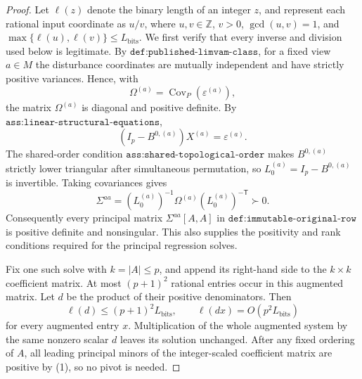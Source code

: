 \documentclass{article}
\begin{document}
\begin{proof}
Let \(\ell(z)\) denote the binary length of an integer \(z\), and represent each rational input coordinate as \(u/v\), where \(u,v\in\mathbb Z\), \(v>0\), \(\gcd(u,v)=1\), and \(\max\{\ell(u),\ell(v)\}\leq L_{\mathrm{bits}}\).  We first verify that every inverse and division used below is legitimate.  By \(\texttt{def:published-limvam-class}\), for a fixed view \(a\in M\) the disturbance coordinates are mutually independent and have strictly positive variances.  Hence, with
\[
 \Omega^{(a)}=\operatorname{Cov}_P(\varepsilon^{(a)}),
\]
the matrix \(\Omega^{(a)}\) is diagonal and positive definite.  By \(\texttt{ass:linear-structural-equations}\),
\[
 (I_p-B^{0,(a)})X^{(a)}=\varepsilon^{(a)}.
\]
The shared-order condition \(\texttt{ass:shared-topological-order}\) makes \(B^{0,(a)}\) strictly lower triangular after simultaneous permutation, so \(L_0^{(a)}=I_p-B^{0,(a)}\) is invertible.  Taking covariances gives
\[
 \Sigma^{aa}=(L_0^{(a)})^{-1}\Omega^{(a)}(L_0^{(a)})^{-\mathsf T}\succ0.
\tag{1}
\]
Consequently every principal matrix \(\Sigma^{aa}[A,A]\) in \(\texttt{def:immutable-original-row}\) is positive definite and nonsingular.  This also supplies the positivity and rank conditions required for the principal regression solves.

Fix one such solve with \(k=|A|\leq p\), and append its right-hand side to the \(k\times k\) coefficient matrix.  At most \((p+1)^2\) rational entries occur in this augmented matrix.  Let \(d\) be the product of their positive denominators.  Then
\[
 \ell(d)\leq (p+1)^2L_{\mathrm{bits}},
 \qquad
 \ell(dx)=O(p^2L_{\mathrm{bits}})
\tag{2}
\]
for every augmented entry \(x\).  Multiplication of the whole augmented system by the same nonzero scalar \(d\) leaves its solution unchanged.  After any fixed ordering of \(A\), all leading principal minors of the integer-scaled coefficient matrix are positive by (1), so no pivot is needed.


\end{proof}
\end{document}

